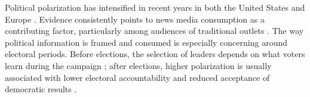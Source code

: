 \documentclass[12pt]{article}
\begin{document}

	Political polarization has intensified in recent years  in both  the United States and Europe \citep{Reiljan2019FearAL}. Evidence consistently points to news media consumption as a contributing factor, particularly among audiences of traditional outlets \citep[][]{martin2017,Boxell2020CrossCountryTI}. The way political information is framed and consumed is especially concerning around electoral periods. Before elections,  the selection of leaders depends on what voters learn during the campaign \citep{Besley2005}; after elections, higher polarization is usually associated with lower electoral accountability and reduced acceptance of democratic results \citep{Graham2019DemocracyIA}.
\end{document}
